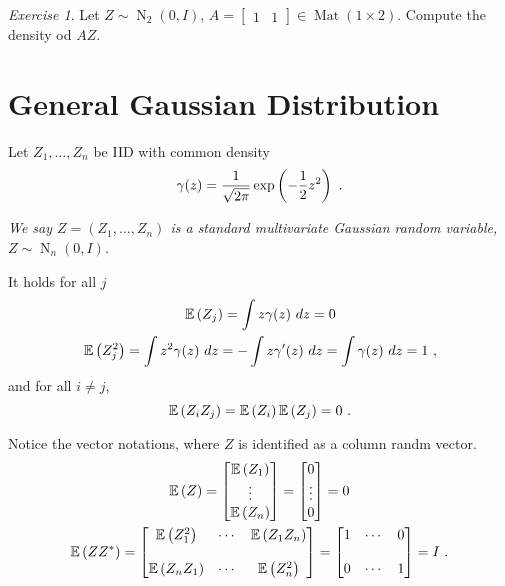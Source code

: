 \documentclass[12pt,a4paper]{amsart}
\newcommand{\MRof}[2]{\operatorname{Mat}\left(#1\times#2\right)}
\newcommand{\gaussian}[3]{\operatorname{N}_{#1}\left(#2,#3\right)}
\theoremstyle{plain}%
\theoremstyle{definition}
\theoremstyle{remark}
\newtheorem{exercise}{Exercise}
\begin{document}
\begin{exercise}
  Let $Z \sim \gaussian 2 0 I$, $A =
  \begin{bmatrix}
    1 & 1
  \end{bmatrix}
\in \MRof 1 2$. Compute the density od $AZ$.
\end{exercise}

\section{General Gaussian Distribution}
\label{sec:GGD}
Let $Z_1,\dots,Z_n$ be IID with common density\
\begin{equation*}
  \gamma(z) = \frac1{\sqrt{2\pi}} \exp\left(-\frac12 z^2\right) \ . 
\end{equation*}

\emph{We say $Z = (Z_1,\dots,Z_n)$ is a standard multivariate Gaussian
random variable, $Z \sim \gaussian n 0 I$}. 

It holds for all $j$
\begin{gather*}
  \operatorname{\mathbb E}\left(Z_j\right) = \int z \gamma(z) \ dz = 0
\\
  \operatorname{\mathbb E}\left(Z_j^2\right) = \int z ^2 \gamma(z) \ dz = - \int z \gamma'(z) \
  dz = \int \gamma(z) \ dz = 1 \ ,
\end{gather*}
and for all $i \neq j$,
\begin{equation*}
  \operatorname{\mathbb E}\left(Z_iZ_j\right) = \operatorname{\mathbb E}\left(Z_i\right) \operatorname{\mathbb E}\left(Z_j\right) = 0 \ .
\end{equation*}

Notice the vector notations, where $Z$ is identified as a column randm
vector.
\begin{gather*}
  \operatorname{\mathbb E}\left(Z\right) =
  \begin{bmatrix}
    \operatorname{\mathbb E}\left(Z_1\right) \\ \vdots \\ \operatorname{\mathbb E}\left(Z_n\right)
  \end{bmatrix}
=   \begin{bmatrix}
    0 \\ \vdots \\ 0
  \end{bmatrix}
= 0 \\
\operatorname{\mathbb E}\left(ZZ^*\right) =
\begin{bmatrix}
  \operatorname{\mathbb E}\left(Z_1^2\right) & \cdots & \operatorname{\mathbb E}\left(Z_1Z_n\right) \\
& \ \\
  \operatorname{\mathbb E}\left(Z_nZ_1\right) & \cdots & \operatorname{\mathbb E}\left(Z_n^2\right)
\end{bmatrix} =
\begin{bmatrix}
  1 & \cdots & 0 \\
& \ \\
  0 & \cdots & 1 
\end{bmatrix} = I \ . 
\end{gather*}
\end{document}
